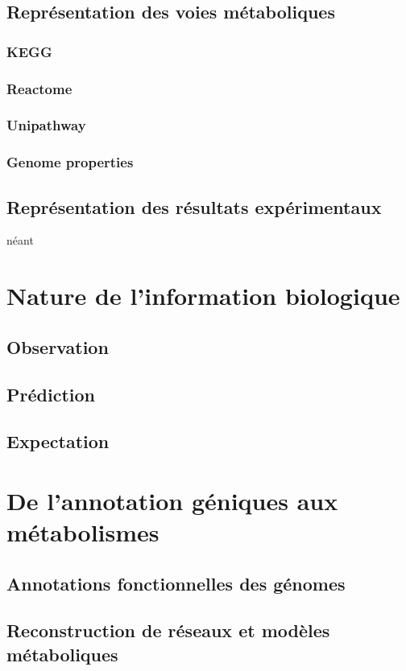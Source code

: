 \subsection{Représentation des voies métaboliques}
\subsubsection{KEGG}
\subsubsection{Reactome}
\subsubsection{Unipathway}
\subsubsection{Genome properties}
\subsection{Représentation des résultats expérimentaux}
néant

\section{Nature de l'information biologique}
\subsection{Observation}
\subsection{Prédiction}
\subsection{Expectation}

\section{De l'annotation géniques aux métabolismes}
\subsection{Annotations fonctionnelles des génomes}
\subsection{Reconstruction de réseaux et modèles métaboliques}
